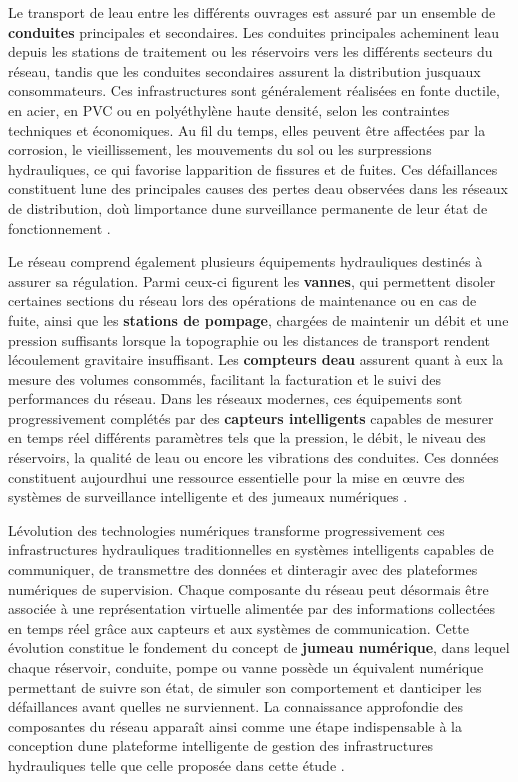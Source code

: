 \documentclass[12pt,a4paper,oneside]{report}
\begin{document}
Le transport de l\textquotesingle eau entre les différents ouvrages est
assuré par un ensemble de \textbf{conduites} principales et secondaires.
Les conduites principales acheminent l\textquotesingle eau depuis les
stations de traitement ou les réservoirs vers les différents secteurs du
réseau, tandis que les conduites secondaires assurent la distribution
jusqu\textquotesingle aux consommateurs. Ces infrastructures sont
généralement réalisées en fonte ductile, en acier, en PVC ou en
polyéthylène haute densité, selon les contraintes techniques et
économiques. Au fil du temps, elles peuvent être affectées par la
corrosion, le vieillissement, les mouvements du sol ou les surpressions
hydrauliques, ce qui favorise l\textquotesingle apparition de fissures
et de fuites. Ces défaillances constituent l\textquotesingle une des
principales causes des pertes d\textquotesingle eau observées dans les
réseaux de distribution, d\textquotesingle où
l\textquotesingle importance d\textquotesingle une surveillance
permanente de leur état de fonctionnement \cite{ref35}.

Le réseau comprend également plusieurs équipements hydrauliques destinés
à assurer sa régulation. Parmi ceux-ci figurent les \textbf{vannes}, qui
permettent d\textquotesingle isoler certaines sections du réseau lors
des opérations de maintenance ou en cas de fuite, ainsi que les
\textbf{stations de pompage}, chargées de maintenir un débit et une
pression suffisants lorsque la topographie ou les distances de transport
rendent l\textquotesingle écoulement gravitaire insuffisant. Les
\textbf{compteurs d\textquotesingle eau} assurent quant à eux la mesure
des volumes consommés, facilitant la facturation et le suivi des
performances du réseau. Dans les réseaux modernes, ces équipements sont
progressivement complétés par des \textbf{capteurs intelligents}
capables de mesurer en temps réel différents paramètres tels que la
pression, le débit, le niveau des réservoirs, la qualité de
l\textquotesingle eau ou encore les vibrations des conduites. Ces
données constituent aujourd\textquotesingle hui une ressource
essentielle pour la mise en œuvre des systèmes de surveillance
intelligente et des jumeaux numériques \cite{ref20}.

L\textquotesingle évolution des technologies numériques transforme
progressivement ces infrastructures hydrauliques traditionnelles en
systèmes intelligents capables de communiquer, de transmettre des
données et d\textquotesingle interagir avec des plateformes numériques
de supervision. Chaque composante du réseau peut désormais être associée
à une représentation virtuelle alimentée par des informations collectées
en temps réel grâce aux capteurs et aux systèmes de communication. Cette
évolution constitue le fondement du concept de \textbf{jumeau
numérique}, dans lequel chaque réservoir, conduite, pompe ou vanne
possède un équivalent numérique permettant de suivre son état, de
simuler son comportement et d\textquotesingle anticiper les défaillances
avant qu\textquotesingle elles ne surviennent. La connaissance
approfondie des composantes du réseau apparaît ainsi comme une étape
indispensable à la conception d\textquotesingle une plateforme
intelligente de gestion des infrastructures hydrauliques telle que celle
proposée dans cette étude \cite{ref37}.
\end{document}
